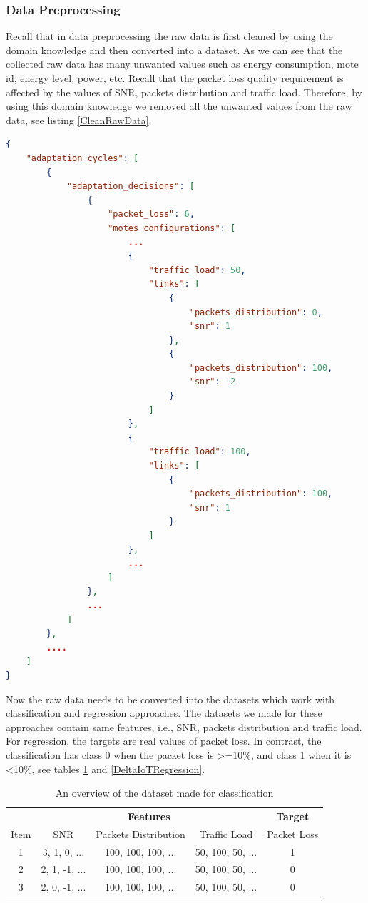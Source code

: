 \documentclass[a4paper,12pt]{article}
\begin{document}
\subsubsection{Data Preprocessing}
Recall that in data preprocessing the raw data is first cleaned by using the domain knowledge and then converted into a dataset. As we can see that the collected raw data has many unwanted values such as energy consumption, mote id, energy level, power, etc. Recall that the packet loss quality requirement is affected by the values of SNR, packets distribution and traffic load. Therefore, by using this domain knowledge we removed all the unwanted values from the raw data, see listing \ref{CleanRawData}.
\begin{lstlisting}[language=json, caption=An overview of the raw data after removing the unwanted values, label=CleanRawData]
{
	"adaptation_cycles": [
		{
			"adaptation_decisions": [
				{
					"packet_loss": 6,
					"motes_configurations": [
						...
						{
							"traffic_load": 50,
							"links": [
								{
									"packets_distribution": 0,
									"snr": 1
								},
								{
									"packets_distribution": 100,
									"snr": -2
								}
							]
						},
						{
							"traffic_load": 100,
							"links": [
								{
									"packets_distribution": 100,
									"snr": 1	
								}
							]
						},
						...
					]
				},
				...
			]
		},
		....
	]
}
\end{lstlisting}
Now the raw data needs to be converted into the datasets which work with classification and regression approaches. The datasets we made for these approaches contain same features, i.e., SNR, packets distribution and traffic load. For regression, the targets are real values of packet loss. In contrast, the classification has class 0 when the packet loss is >=10\%, and class 1 when it is <10\%, see tables \ref{DeltaIoTClassification} and \ref{DeltaIoTRegression}.
\begin{table}[H]
	\centering
	\begin{tabular}{c|c|c|c|c}
		\hline
		\multicolumn{1}{c|}{} & \multicolumn{3}{c|}{\textbf{Features}} & \multicolumn{1}{c}{\textbf{Target}} \\
		\cline{1-1} \cline{2-4} \cline{5-5}
		\multicolumn{1}{c|}{Item} & \multicolumn{1}{c|}{SNR} & \multicolumn{1}{c|}{Packets Distribution} & \multicolumn{1}{c|}{Traffic Load} & \multicolumn{1}{c}{Packet Loss} \\
		\cline{1-1} \cline{2-2} \cline{3-3} \cline{4-4} \cline{5-5}
		1 & 3, 1, 0, ... & 100, 100, 100, ... & 50, 100, 50, ... & 1 \\
		\hline
		2 & 2, 1, -1, ... & 100, 100, 100, ... & 50, 100, 50, ... & 0 \\
		\hline
		3 & 2, 0, -1, ... & 100, 100, 100, ... & 50, 100, 50, ... & 0 \\
		\hline
	\end{tabular}
	\caption{An overview of the dataset made for classification}
	\label{DeltaIoTClassification}
\end{table}
\end{document}
